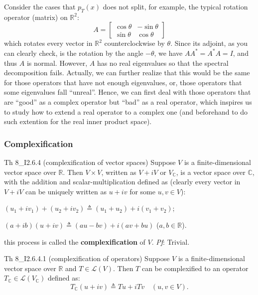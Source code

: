 \documentclass{article}
\begin{document}
Consider the cases that $p_T(x)$ does not split, for example, the typical rotation operator (matrix) on $\mathbb{R}^2$:
$$ A = \begin{bmatrix}
    \cos\theta & -\sin\theta \\
    \sin\theta & \cos\theta
\end{bmatrix} $$
which rotates every vector in $\mathbb{R}^2$ counterclockwise by $\theta$. Since its adjoint, as you can clearly check, is the rotation by the angle $-\theta$, we have $AA^* = A^*A = I$, and thus $A$ is normal. However, $A$ has no real eigenvalues so that the spectral decomposition fails. Actually, we can further realize that this would be the same for those operators that have not enough eigenvalues, or, those operators that some eigenvalues fall ``unreal''. Hence, we can first deal with those operators that are ``good'' as a complex operator but ``bad'' as a real operator, which inspires us to study how to extend a real operator to a complex one (and beforehand to do such extention for the real inner product space).

\subsubsection{Complexification}

\begin{Th}{Th 8\_I2.6.4 (complexification of vector spaces)}
    Suppose $V$ is a finite-dimensional vector space over $\mathbb{R}$. Then $V\times V$, \textcolor{Df}{written as $V+iV$ or $V_{\mathbb{C}}$}, is a vector space over $\mathbb{C}$, with the addition and scalar-multiplication defined as (clearly every vector in $V+iV$ can be uniquely written as $u+iv$ for some $u, v\in V$):
    \begin{compactenum}
        \item $(u_1+iv_1) + (u_2+iv_2) \triangleq (u_1+u_2) + i(v_1+v_2)$;
        \item $(a+ib)(u+iv) \triangleq (au-bv) + i(av+bu)$ ($a, b\in\mathbb{R}$).
    \end{compactenum}
    \textcolor{Df}{this process is called the \textbf{complexification} of $V$}.
    \tcblower
    \textit{Pf}: Trivial.
\end{Th}

\begin{Th}{Th 8\_I2.6.4.1 (complexification of operators)}
    Suppose $V$ is a finite-dimensional vector space over $\mathbb{R}$ and $T\in\mathcal{L}(V)$. Then $T$ can be complexified to an operator $T_{\mathbb{C}}\in\mathcal{L}(V_{\mathbb{C}})$ \textcolor{Df}{defined as:
    $$ T_{\mathbb{C}}(u+iv) \triangleq Tu + iTv \quad (u, v\in V). $$}
\end{Th}
\end{document}
